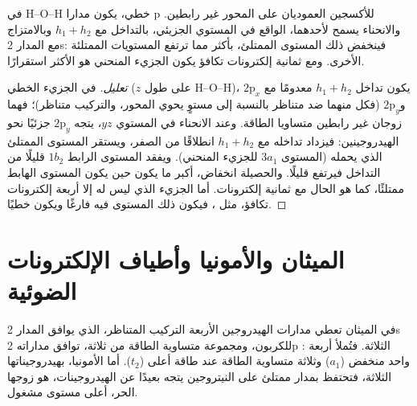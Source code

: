 \begin{proposition}\label{prop:b2:fragment-orbitals:bent-water}
في H--O--H خطي، يكون مدارا p للأكسجين العموديان على المحور
غير رابطين. والانحناء يسمح لأحدهما، الواقع في المستوي الجزيئي، بالتداخل
مع $h_1 + h_2$ وبالامتزاج مع المدار 2s: فينخفض ذلك المستوى الممتلئ، بأكثر مما
ترتفع المستويات الممتلئة الأخرى. ومع ثمانية إلكترونات تكافؤ يكون الجزيء المنحني
هو الأكثر استقرارًا.
\end{proposition}

\begin{proof}[تعليل]
في الجزيء الخطي ($z$ على طول H--O--H)، يكون تداخل $h_1 + h_2$ معدومًا مع
$2\mathrm p_x$ و$2\mathrm p_y$ (فكل منهما ضد متناظر بالنسبة إلى مستوٍ
يحوي المحور، والتركيب متناظر)؛ فهما زوجان غير رابطين متساويا
الطاقة. وعند الانحناء في المستوي $yz$، يتجه $2\mathrm p_y$ جزئيًا نحو
الهيدروجينين: فيزداد تداخله مع $h_1 + h_2$ انطلاقًا من الصفر، ويستقر المستوى الممتلئ
الذي يحمله (المستوى $3a_1$ للجزيء المنحني). ويفقد المستوى الرابط
$1b_2$ قليلًا من التداخل فيرتفع قليلًا. والحصيلة انخفاض،
أكبر ما يكون حين يكون المستوى الهابط ممتلئًا، كما هو الحال مع ثمانية إلكترونات.
أما الجزيء الذي ليس له إلا أربعة إلكترونات تكافؤ، مثل ، فيكون ذلك المستوى فيه
فارغًا ويكون خطيًا.
\end{proof}

\section{الميثان والأمونيا وأطياف الإلكترونات الضوئية}

في الميثان تعطي مدارات الهيدروجين الأربعة التركيب المتناظر، الذي
يوافق المدار 2s للكربون، ومجموعة متساوية الطاقة من ثلاثة، توافق
مداراته 2p الثلاثة. فتُملأ أربعة : واحد منخفض ($a_1$) وثلاثة
متساوية الطاقة عند طاقة أعلى ($t_2$). أما الأمونيا، بهيدروجيناتها الثلاثة، فتحتفظ
بمدار ممتلئ على النيتروجين يتجه بعيدًا عن الهيدروجينات، هو زوجها الحر،
أعلى مستوى مشغول.

